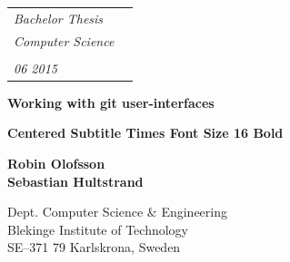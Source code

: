 \documentclass[a4paper,oneside]{bth} %
\begin{document}
		\pagestyle{plain}
		
		{\pagestyle{empty}
		\changepage{5cm}{1cm}{-0.5cm}{-0.5cm}{}{-2cm}{}{}{}
		\noindent%
			{\small
				\begin{tabular}{p{} p{}}
					\textit{Bachelor Thesis}&\multirow{4}{*}{\bthcsnotextlogo{3cm}}
					\\
					\textit{Computer Science}
					\\
					\\
					\textit{06 2015}
					\\
				\end{tabular}
			}
			\begin{center}
				\par\vspace {7cm}
				{\Huge\textbf{Working with git user-interfaces}}   
				\par\vspace {0.5cm}
				{\Large\textbf{Centered Subtitle Times Font Size 16 Bold}}                   
				\par\vspace {3cm}
				{\Large\textbf{Robin Olofsson}}
				\\
				{\Large\textbf{Sebastian Hultstrand}}
				\par\vspace {7cm}
			\end{center}

			\noindent%
			{\small Dept. Computer Science \& Engineering 
			\\
			Blekinge Institute of Technology
			\\
			SE--371 79 Karlskrona, Sweden}
			\clearpage
		}
\end{document}
